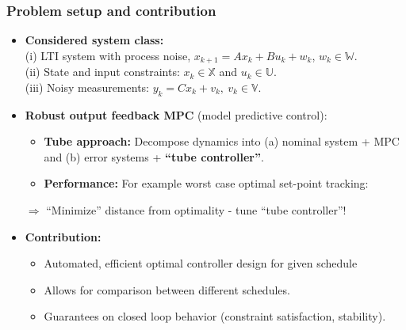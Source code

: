 \documentclass{beamer}
\begin{document}
\begin{frame}
 \frametitle{Problem setup and contribution  }
 \begin{itemize} 
  \item \textbf{Considered system class:} \\(i) LTI system with process noise, $x_{k+1} = A x_k + B u_k + w_k$,  $w_k \in \mathbb{W}$.\\
  (ii) State and input constraints: $x_k\in\mathbb{X}$ and $u_k\in\mathbb{U}$.\\
  (iii) Noisy measurements: $y_k = C x_k + v_k, \ v_k \in \mathbb{V}$.
    \item \textbf{Robust output feedback MPC} (model predictive control):
  \begin{itemize}
   \item \textbf{Tube approach:} Decompose dynamics into (a)  nominal system + MPC
   and (b) error systems +  \textbf{ ``tube controller''}.
   \item \textbf{Performance:} For example  worst case optimal set-point tracking: 
  \end{itemize}  
	$\Rightarrow$    ``Minimize''  distance from optimality - tune ``tube controller''! 
\item  \textbf{Contribution:}
\begin{itemize}  
\item 
Automated, efficient optimal controller design  for given schedule
 \item Allows for comparison between different schedules.
 \item Guarantees on closed loop behavior (constraint satisfaction, stability). 
\end{itemize}
\end{itemize}
 

\end{frame}
\end{document}
